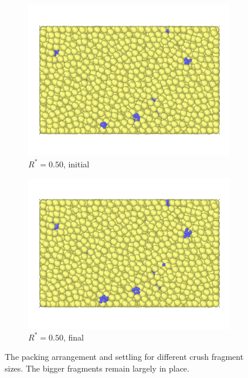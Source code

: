 \begin{figure}[!ht]
	\begin{subfigure}[b]{\imagewidth}
		\centering
		\includegraphics[width=\textwidth]{chapters/figures/crush-fragments/0.50-1.png}
		\caption{$R^* = 0.50$, initial}
	\end{subfigure}
	\begin{subfigure}[b]{\imagewidth}
		\centering
		\includegraphics[width=\textwidth]{chapters/figures/crush-fragments/0.50-2.png}
		\caption{$R^* = 0.50$, final}
	\end{subfigure}
	\caption{The packing arrangement and settling for different crush fragment sizes. The bigger fragments remain largely in place.}
\label{fig:crush-settling-pictures}
\end{figure}
\FloatBarrier
